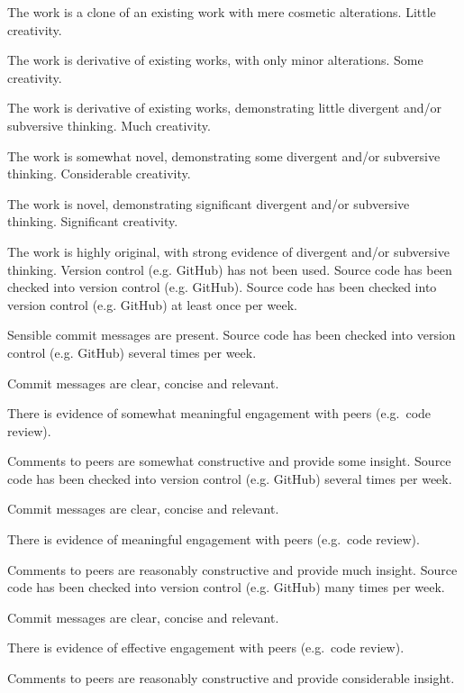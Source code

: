 \documentclass{../../fal_assignment}
\begin{document}
\begin{markingrubric}
	\par The work is a clone of an existing work with mere cosmetic alterations.
	\grade Little creativity.
	\par The work is derivative of existing works, with only minor alterations.
	\grade Some creativity.
	\par The work is derivative of existing works, demonstrating little divergent and/or subversive thinking.
	\grade Much creativity.
	\par The work is somewhat novel, demonstrating some divergent and/or subversive thinking.
	\grade Considerable creativity.
	\par The work is novel, demonstrating significant divergent and/or subversive thinking.
	\grade Significant creativity.
	\par The work is highly original, with strong evidence of divergent and/or subversive thinking.
	\grade\fail Version control (e.g. GitHub) has not been used.
	\grade Source code has been checked into version control (e.g. GitHub).
	\grade Source code has been checked into version control (e.g. GitHub) at least once per week.
	\par Sensible commit messages are present.
	\grade Source code  has been checked into version control (e.g. GitHub) several times per week.
	\par Commit messages are clear, concise and relevant.
	\par There is evidence of somewhat meaningful engagement with peers (e.g.\ code review).
	\par Comments to peers are somewhat constructive and provide some insight.
	\grade Source code has been checked into version control (e.g. GitHub) several times per week.
	\par Commit messages are clear, concise and relevant.
	\par There is evidence of meaningful engagement with peers (e.g.\ code review).
	\par Comments to peers are reasonably constructive and provide much insight.
	\grade Source code has been checked into version control (e.g. GitHub) many times per week.
	\par Commit messages are clear, concise and relevant.
	\par There is evidence of effective engagement with peers (e.g.\ code review).
	\par Comments to peers are reasonably constructive and provide considerable insight.
\end{markingrubric}
	
\end{document}
